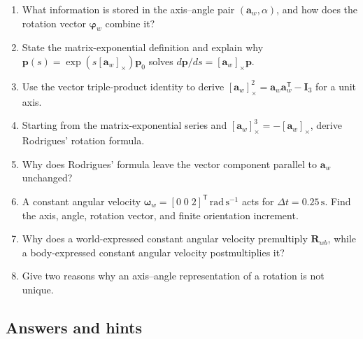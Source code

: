 \documentclass[
  australian,
  12pt,
  letterpaper,
  DIV=11,
  numbers=noendperiod,
  twoside]{scrreprt}
\providecommand{\tightlist}{%
  \setlength{\itemsep}{0pt}\setlength{\parskip}{0pt}}
\begin{document}
\begin{enumerate}
\def\labelenumi{\arabic{enumi}.}
\tightlist
\item
  What information is stored in the axis--angle pair
  \((\mathbf a_w,\alpha)\), and how does the rotation vector
  \(\boldsymbol\varphi_w\) combine it?
\item
  State the matrix-exponential definition and explain why
  \(\mathbf p(s)=\exp(s[\mathbf a_w]_\times)\mathbf p_0\) solves
  \(d\mathbf p/ds=[\mathbf a_w]_\times\mathbf p\).
\item
  Use the vector triple-product identity to derive
  \([\mathbf a_w]_\times^2=\mathbf a_w\mathbf a_w^\mathsf T-\mathbf I_3\)
  for a unit axis.
\item
  Starting from the matrix-exponential series and
  \([\mathbf a_w]_\times^3=-[\mathbf a_w]_\times\), derive Rodrigues'
  rotation formula.
\item
  Why does Rodrigues' formula leave the vector component parallel to
  \(\mathbf a_w\) unchanged?
\item
  A constant angular velocity
  \(\boldsymbol\omega_w=[0\;0\;2]^\mathsf T\,\mathrm{rad\,s^{-1}}\) acts
  for \(\Delta t=0.25\,\mathrm s\). Find the axis, angle, rotation
  vector, and finite orientation increment.
\item
  Why does a world-expressed constant angular velocity premultiply
  \(\mathbf R_{wb}\), while a body-expressed constant angular velocity
  postmultiplies it?
\item
  Give two reasons why an axis--angle representation of a rotation is
  not unique.
\end{enumerate}

\subsection*{Answers and hints}\label{answers-and-hints-19}
\end{document}
